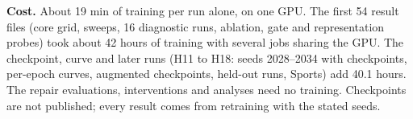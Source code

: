 \documentclass[conference]{IEEEtran}
\begin{document}
\textbf{Cost.} About 19 min of training per run alone, on one GPU. The first 54 result files (core grid, sweeps, 16 diagnostic runs, ablation, gate and representation probes) took about 42 hours of training with several jobs sharing the GPU. The checkpoint, curve and later runs (H11 to H18: seeds 2028--2034 with checkpoints, per-epoch curves, augmented checkpoints, held-out runs, Sports) add 40.1 hours. The repair evaluations, interventions and analyses need no training. Checkpoints are not published; every result comes from retraining with the stated seeds.
\end{document}
